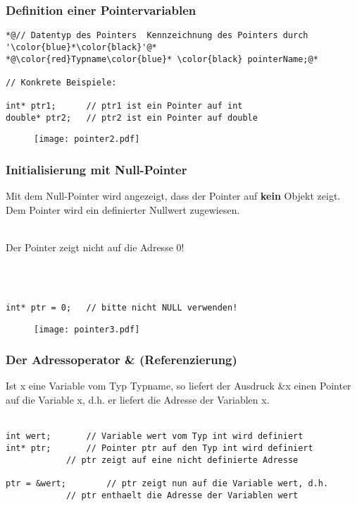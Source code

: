 \subsubsection{Definition einer Pointervariablen\hfill}
\label{sec:unterunterabschnitt}
\noindent
\begin{minipage}{\linewidth}
\begin{lstlisting}
*@// Datentyp des Pointers	Kennzeichnung des Pointers durch '\color{blue}*\color{black}'@*
*@\color{red}Typname\color{blue}* \color{black} pointerName;@*

// Konkrete Beispiele:

int* ptr1;		// ptr1 ist ein Pointer auf int
double* ptr2;	// ptr2 ist ein Pointer auf double
\end{lstlisting}
\end{minipage}
\begin{figure}[h]
	\centering
	\texttt{[image: pointer2.pdf]}
\end{figure}

\subsubsection{Initialisierung mit Null-Pointer\hfill}
\label{sec_unterunterabschnitt}
Mit dem Null-Pointer wird angezeigt, dass der Pointer auf \textbf{kein} Objekt zeigt. Dem Pointer wird ein definierter Nullwert zugewiesen.\\
\\
\begin{hinweis}
Der Pointer zeigt nicht auf die Adresse 0!
\end{hinweis}
\\
\\
\noindent
\begin{minipage}{\linewidth}
\begin{lstlisting}
int* ptr = 0;	// bitte nicht NULL verwenden!
\end{lstlisting}
\end{minipage}
\begin{figure}[h]
	\centering
	\texttt{[image: pointer3.pdf]}
\end{figure}

\subsubsection{Der Adressoperator \& \textbf{(Referenzierung)}\hfill}
\label{sec:unterunterabschnitt}
Ist x eine Variable vom Typ Typname, so liefert der Ausdruck \&x einen Pointer auf die Variable x, d.h. er liefert die Adresse der Variablen x.\\
\\
\noindent
\begin{minipage}{\linewidth}
\begin{lstlisting}
int wert;		// Variable wert vom Typ int wird definiert
int* ptr;		// Pointer ptr auf den Typ int wird definiert
			// ptr zeigt auf eine nicht definierte Adresse
		
ptr = &wert;		// ptr zeigt nun auf die Variable wert, d.h. 
			// ptr enthaelt die Adresse der Variablen wert
\end{lstlisting}
\end{minipage}

